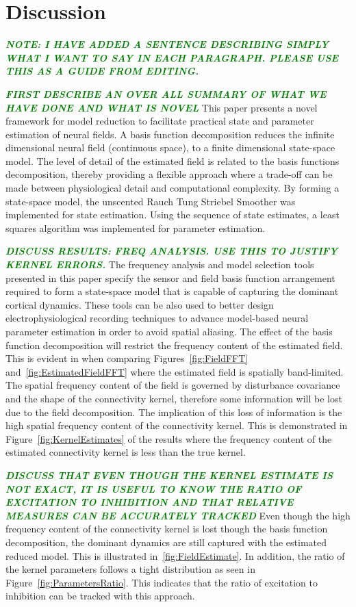 \documentclass[12pt]{iopart}
\newcommand{\omg}[1]{\textsf{\emph{\textbf{\textcolor{green}{#1}}}}}
\begin{document}
\section{Discussion}\label{DiscussionSection}

\omg{NOTE: I HAVE ADDED A SENTENCE DESCRIBING SIMPLY WHAT I WANT TO SAY IN EACH PARAGRAPH. PLEASE USE THIS AS A GUIDE FROM EDITING.}

\omg{FIRST DESCRIBE AN OVER ALL SUMMARY OF WHAT WE HAVE DONE AND WHAT IS NOVEL}
This paper presents a novel framework for model reduction to facilitate practical state and parameter estimation of neural fields. A basis function decomposition reduces the infinite dimensional neural field (continuous space), to a finite dimensional state-space model. The level of detail of the estimated field is related to the basis functions decomposition, thereby providing a flexible approach where a trade-off can be made between physiological detail and computational complexity. By forming a state-space model, the unscented Rauch Tung Striebel Smoother was implemented for state estimation. Using the sequence of state estimates, a least squares algorithm was implemented for parameter estimation.  

\omg{DISCUSS RESULTS: FREQ ANALYSIS. USE THIS TO JUSTIFY KERNEL ERRORS.}
The frequency analysis and model selection tools presented in this paper specify the sensor and field basis function arrangement required to form a state-space model that is capable of capturing the dominant cortical dynamics. These tools can be also used to better design electrophysiological recording techniques to advance model-based neural parameter estimation in order to avoid spatial aliasing. The effect of the basis function decomposition will restrict the frequency content of the estimated field. This is evident in when comparing Figures~\ref{fig:FieldFFT} and~\ref{fig:EstimatedFieldFFT} where the estimated field is spatially band-limited. The spatial frequency content of the field is governed by disturbance covariance and the shape of the connectivity kernel, therefore some information will be lost due to the field decomposition. The implication of this loss of information is the high spatial frequency content of the connectivity kernel. This is demonstrated in Figure~\ref{fig:KernelEstimates} of the results where the frequency content of the estimated connectivity kernel is less than the true kernel.

\omg{DISCUSS THAT EVEN THOUGH THE KERNEL ESTIMATE IS NOT EXACT, IT IS USEFUL TO KNOW THE RATIO OF EXCITATION TO INHIBITION AND THAT RELATIVE MEASURES CAN BE ACCURATELY TRACKED}
Even though the high frequency content of the connectivity kernel is lost though the basis function decomposition, the dominant dynamics are still captured with the estimated reduced model. This is illustrated in~\ref{fig:FieldEstimate}. In addition, the ratio of the kernel parameters follows a tight distribution as seen in Figure~\ref{fig:ParametersRatio}. This indicates that the ratio of excitation to inhibition can be tracked with this approach. 
\end{document}
